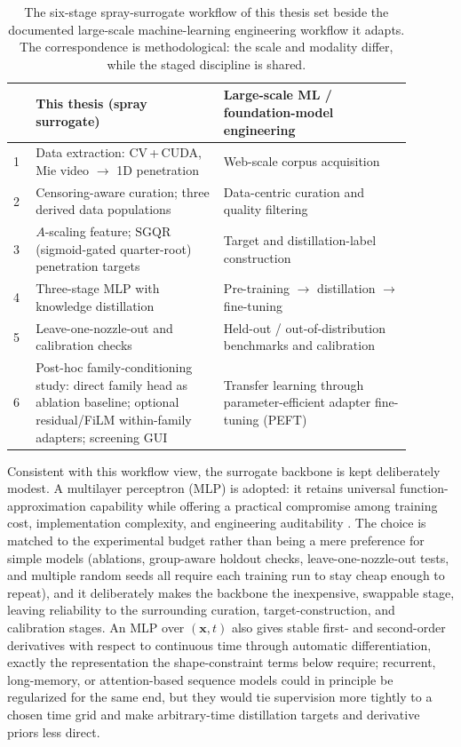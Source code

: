 \begin{table}[!ht]
\centering
\footnotesize
\caption{The six-stage spray-surrogate workflow of this thesis set beside the documented large-scale machine-learning engineering workflow it adapts. The correspondence is methodological: the scale and modality differ, while the staged discipline is shared.}
\label{tab:workflow-mapping-en}
\begin{tabular}{@{}p{0.05\linewidth}p{0.42\linewidth}p{0.42\linewidth}@{}}
\toprule
 & \textbf{This thesis (spray surrogate)} & \textbf{Large-scale ML / foundation-model engineering} \\
\midrule
1 & Data extraction: CV\,+\,CUDA, Mie video $\to$ 1D penetration & Web-scale corpus acquisition \cite{Penedo2023RefinedWeb} \\
2 & Censoring-aware curation; three derived data populations & Data-centric curation and quality filtering \cite{Albalak2024DataSelection} \\
3 & $A$-scaling feature; $\mathrm{SGQR}$ (sigmoid-gated quarter-root) penetration targets & Target and distillation-label construction \cite{Xu2024LLMDistillation} \\
4 & Three-stage MLP with knowledge distillation & Pre-training $\to$ distillation $\to$ fine-tuning \cite{Zhao2023LLMSurvey} \\
5 & Leave-one-nozzle-out and calibration checks & Held-out / out-of-distribution benchmarks and calibration \cite{Chang2024LLMEval} \\
6 & Post-hoc family-conditioning study: direct family head as ablation baseline; optional residual/FiLM within-family adapters; screening GUI & Transfer learning through parameter-efficient adapter fine-tuning (PEFT) \cite{Han2024PEFT} \\
\bottomrule
\end{tabular}
\end{table}

Consistent with this workflow view, the surrogate backbone is kept deliberately modest. A multilayer perceptron (MLP) is adopted: it retains universal function-approximation capability \cite{Hornik1989UAT} while offering a practical compromise among training cost, implementation complexity, and engineering auditability \cite{BishopPRML2006}. The choice is matched to the experimental budget rather than being a mere preference for simple models (ablations, group-aware holdout checks, leave-one-nozzle-out tests, and multiple random seeds all require each training run to stay cheap enough to repeat), and it deliberately makes the backbone the inexpensive, swappable stage, leaving reliability to the surrounding curation, target-construction, and calibration stages. An MLP over \((\mathbf{x},t)\) also gives stable first- and second-order derivatives with respect to continuous time through automatic differentiation, exactly the representation the shape-constraint terms below require; recurrent, long-memory, or attention-based sequence models could in principle be regularized for the same end, but they would tie supervision more tightly to a chosen time grid and make arbitrary-time distillation targets and derivative priors less direct.

